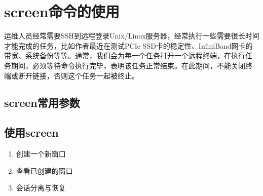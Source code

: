 \section{screen命令的使用}
\label{sec:screenCmd}

运维人员经常需要SSH到远程登录Unix/Linux服务器，经常执行一些需要很长时间
才能完成的任务，比如作者最近在测试PCIe SSD卡的稳定性、InfiniBand网卡的
带宽、系统备份等等。通常，我们会为每一个任务打开一个远程终端，在执行任
务期间，必须等待命令执行完毕，表明该任务正常结束。在此期间，不能关闭终
端或断开链接，否则这个任务一起被终止。

\subsection{screen常用参数}

\subsection{使用screen}

\begin{enumerate}
\item 创建一个新窗口
\item 查看已创建的窗口
\item 会话分离与恢复
\end{enumerate}
